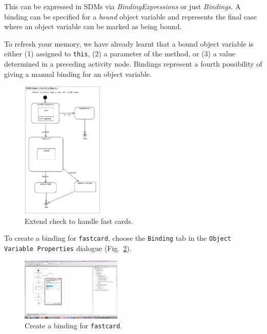 This can be expressed in SDMs via \emph{BindingExpressions} or just
\emph{Bindings}.  A binding can be specified for a \emph{bound} object variable
and represents the final case where an object variable can be marked as being
bound.  

To refresh your memory, we have already learnt that a bound object
variable is either (1) assigned to \texttt{this}, (2) a parameter of the method,
or (3) a value determined in a preceding activity node.  Bindings represent a
fourth possibility of giving a manual binding for an object variable. 

\begin{figure}[htbp]
\begin{center}
  \includegraphics[width=0.35\textwidth]{pics/sdmBilder/bindings/fastcard_controlflow}
  \caption{Extend check to handle fast cards.}  
  \label{fig:sdm_fastcard_2}
\end{center}
\end{figure}

To create a binding for \texttt{fastcard}, choose the \texttt{Binding} tab in
the \texttt{Object Variable Properties} dialogue
(Fig.~\ref{fig:sdm_fastcard_3}). 

\begin{figure}[htbp]
\begin{center}
  \includegraphics[width=0.427\textwidth]{pics/sdmBilder/bindings/fastcard_bindingexp}
  \caption{Create a binding for \texttt{fastcard}.}  
  \label{fig:sdm_fastcard_3}
\end{center}
\end{figure}


